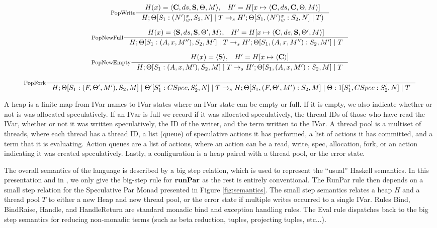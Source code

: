 \begin{figure*}
\[%
\inference[\text{PopWrite}]{H(x) = \langle \commit, ds, \spec, \Theta, M\rangle, \;\;\; H' = H[x \mapsto \langle \commit, ds, \commit, \Theta, M\rangle]}{H; \Theta[S_1: (N')_w^x, S_2, N] \; | \; T \specStep H'; \Theta[S_1, (N')_w^x : S_2, N] \; | \; T)}
\]

\[%
\inference[\text{PopNewFull}]{H(x) = \langle \spec, ds, \spec, \Theta', M \rangle, \;\;\; H' = H[x \mapsto \langle \commit, ds, \spec, \Theta', M\rangle]}{H; \Theta[S_1 : (A, x, M''), S_2, M'] \; | \; T \specStep H';  \Theta[S_1, (A, x, M'') : S_2, M'] \; | \; T}
\]

\[%
\inference[\text{PopNewEmpty}]{H(x) = \langle \spec \rangle, \;\;\; H' = H[x \mapsto \langle \commit \rangle]}{H; \Theta[S_1 : (A, x, M'), S_2, M] \; | \; T \specStep H';  \Theta[S_1, (A, x, M') : S_2, M] \; | \; T}
\]

\[%
\inference[\text{PopFork}]{}{H; \Theta[S_1 : (F, \Theta', M'), S_2, M] \; | \; \Theta'[S_1' : CSpec, S_2', N] \; | \; T \specStep H; \Theta[S_1, (F, \Theta', M'): S_2, M] \; | \; \Theta:1[S_1', CSpec : S_2', N] \; | \; T}
\]
\caption{operational Semantics}
\label{fig:semantics}
\end{figure*}

A heap is a finite map from IVar names to IVar states where an IVar state can be empty or full.  If it is empty, we also indicate whether or not is was allocated speculatively.  If an IVar is full we record if it was allocated speculatively, the thread IDs of those who have read the IVar, whether or not it was written speculatively, the ID of the writer, and the term written to the IVar.  A thread pool is a multiset of threads, where each thread has a thread ID, a list (queue) of speculative actions it has performed, a list of actions it has committed, and a term that it is evaluating.  Action queues are a list of actions, where an action can be a read, write, spec, allocation, fork, or an action indicating it was created speculatively.  Lastly, a configuration is a heap paired with a thread pool, or the error state.


The overall semantics of the language is described by a big step relation, which is used to represent the ``usual'' Haskell semantics.  In this presentation and in \cite{par-monad}, we only give the big-step rule for $\text{\bf runPar}$ as the rest is entirely conventional.  The RunPar rule then depends on a small step relation for the Speculative Par Monad presented in Figure \ref{fig:semantics}.  The small step semantics relates a heap $H$ and a thread pool $T$ to either a new Heap and new thread pool, or the error state if multiple writes occurred to a single IVar. Rules Bind, BindRaise, Handle, and HandleReturn are standard monadic bind and exception handling rules.  The Eval rule dispatches back to the big step semantics for reducing non-monadic terms (such as beta reduction, tuples, projecting tuples, etc...).

